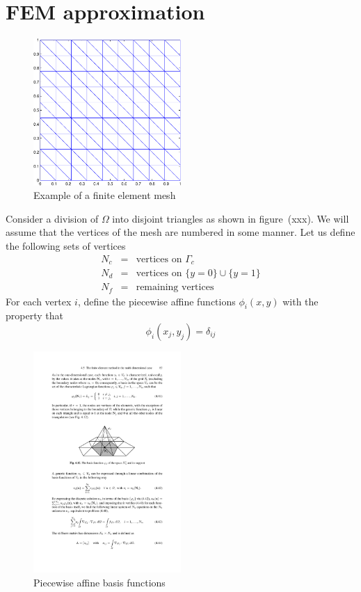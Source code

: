 \documentclass[12pt]{article}
\begin{document}
\section{FEM approximation}
\begin{figure}
\begin{center}
\includegraphics[width=0.5\textwidth]{heat2d_mesh}
\caption{Example of a finite element mesh}
\end{center}
\end{figure}
Consider a division of $\Omega$ into disjoint triangles as shown in figure~(xxx). We will assume that the vertices of the mesh are numbered in some manner. Let us define the following sets of vertices
\begin{eqnarray*}
N_c &=& \mbox{vertices on $\Gamma_c$} \\
N_d &=& \mbox{vertices on } \{y=0\} \cup \{y=1\} \\
N_f &=& \mbox{remaining vertices}
\end{eqnarray*}
For each vertex $i$, define the piecewise affine functions $\phi_i(x,y)$ with the property that
\[
\phi_i(x_j, y_j) = \delta_{ij}
\]
\begin{figure}
\begin{center}
\includegraphics[width=0.5\textwidth]{tria_basis}
\caption{Piecewise affine basis functions}
\end{center}
\end{figure}
\end{document}
